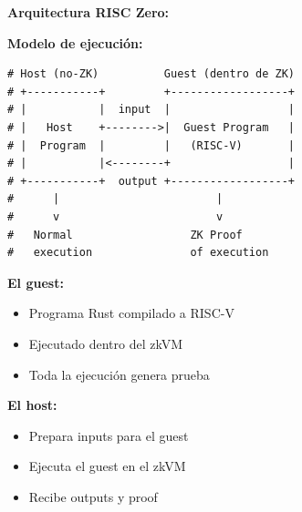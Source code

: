 \documentclass[11pt,a4paper,twoside]{book}
\begin{document}
\begin{mathnote}
\textbf{Arquitectura RISC Zero:}

\textbf{Modelo de ejecuci\'on:}
\begin{lstlisting}[style=python]
# Host (no-ZK)          Guest (dentro de ZK)
# +-----------+         +------------------+
# |           |  input  |                  |
# |   Host    +-------->|  Guest Program   |
# |  Program  |         |   (RISC-V)       |
# |           |<--------+                  |
# +-----------+  output +------------------+
#      |                        |
#      v                        v
#   Normal                  ZK Proof
#   execution               of execution
\end{lstlisting}

\textbf{El guest:}
\begin{itemize}
    \item Programa Rust compilado a RISC-V
    \item Ejecutado dentro del zkVM
    \item Toda la ejecuci\'on genera prueba
\end{itemize}

\textbf{El host:}
\begin{itemize}
    \item Prepara inputs para el guest
    \item Ejecuta el guest en el zkVM
    \item Recibe outputs y proof
\end{itemize}
\end{mathnote}
\end{document}
